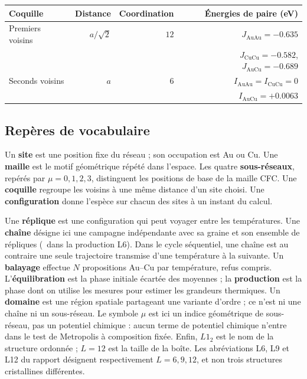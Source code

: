\documentclass[10pt,a4paper]{article}
\newcommand{\Au}{\mathrm{Au}}
\newcommand{\Cu}{\mathrm{Cu}}
\begin{document}
\begin{center}
\begin{tabular}{lrrr}
\toprule
Coquille & Distance & Coordination & Énergies de paire (eV)\\
\midrule
Premiers voisins & $a/\sqrt2$ & $12$ & $J_{\Au\Au}=-0.635$\\
 & & & $J_{\Cu\Cu}=-0.582$, $J_{\Au\Cu}=-0.689$\\
Seconds voisins & $a$ & $6$ & $I_{\Au\Au}=I_{\Cu\Cu}=0$\\
 & & & $I_{\Au\Cu}=+0.0063$\\
\bottomrule
\end{tabular}
\end{center}

\subsection*{Repères de vocabulaire}
Un \textbf{site} est une position fixe du réseau ; son occupation est Au ou Cu.
Une \textbf{maille} est le motif géométrique répété dans l'espace. Les quatre
\textbf{sous-réseaux}, repérés par $\mu=0,1,2,3$, distinguent les positions
de base de la maille CFC. Une \textbf{coquille} regroupe les voisins à une
même distance d'un site choisi. Une \textbf{configuration} donne l'espèce
sur chacun des sites à un instant du calcul.

Une \textbf{réplique} est une configuration qui peut voyager entre les
températures. Une \textbf{chaîne} désigne ici une campagne indépendante
avec sa graine et son ensemble de répliques (\Ntemps\ dans la production L6).
Dans le cycle séquentiel, une chaîne est au contraire une seule trajectoire
transmise d'une température à la suivante. Un \textbf{balayage} effectue
$N$ propositions Au--Cu par température, refus compris. L'\textbf{équilibration}
est la phase initiale écartée des moyennes ; la \textbf{production} est la
phase dont on utilise les mesures pour estimer les grandeurs thermiques.
Un \textbf{domaine} est une région spatiale partageant une variante d'ordre ;
ce n'est ni une chaîne ni un sous-réseau. Le symbole $\mu$ est ici un
indice géométrique de sous-réseau, pas un potentiel chimique : aucun terme
de potentiel chimique n'entre dans le test de Metropolis à composition fixée.
Enfin, $L1_2$ est le nom de la structure ordonnée ; $L=12$ est la taille
de la boîte. Les abréviations L6, L9 et L12 du rapport désignent
respectivement $L=6,9,12$, et non trois structures cristallines différentes.
\end{document}
